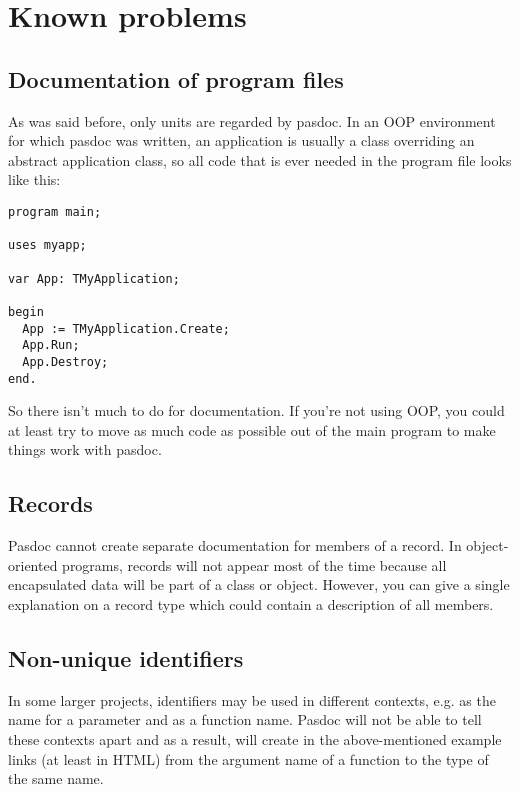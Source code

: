 \documentclass[11pt]{article}
\begin{document}
\section{Known problems}

\subsection{Documentation of program files}

As was said before, only units are regarded by pasdoc.
In an OOP environment for which pasdoc was written, an application is
usually a class overriding an abstract application class, so all
code that is ever needed in the program file looks like this:

\begin{verbatim}
program main;

uses myapp;

var App: TMyApplication;

begin
  App := TMyApplication.Create;
  App.Run;
  App.Destroy;
end.
\end{verbatim}

So there isn't much to do for documentation.
If you're not using OOP, you could at least try to move as much code
as possible out of the main program to make things work with pasdoc.

\subsection{Records}

Pasdoc cannot create separate documentation for members of a record.
In object-oriented programs, records will not appear most of the time
because all encapsulated data will be part of a class or object.
However, you can give a single explanation on a record type which
could contain a description of all members.

\subsection{Non-unique identifiers}

In some larger projects, identifiers may be used in different contexts,
e.g. as the name for a parameter and as a function name.
Pasdoc will not be able to tell these contexts apart and as a result,
will create in the above-mentioned example links (at least in HTML)
from the argument name of a function to the type of the same name.
\end{document}
